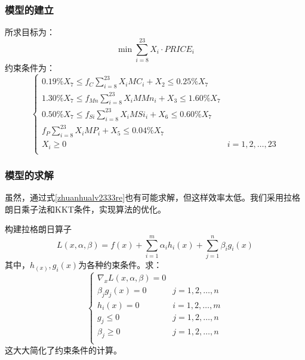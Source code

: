 \documentclass[12pt]{article}%
\begin{document}
\subsubsection{模型的建立}
所求目标为：
\begin{equation}\label{mubiao1}
\min \sum_{i=8}^{23}X_i\cdot PRICE_{i}
\end{equation}
约束条件为：
\begin{equation}\label{zhuanhualv2333re}
\left\{
             \begin{array}{cc}
0.19\% X_7 \leq f_C\sum_{i=8}^{23}X_iMC_i+X_2 \leq 0.25\% X_7\\
1.30\% X_7 \leq f_{Mn}\sum_{i=8}^{23}X_iMMn_i+X_3 \leq 1.60\% X_7\\
0.50\% X_7 \leq f_{Si}\sum_{i=8}^{23}X_iMSi_i+X_6 \leq 0.60\% X_7\\
  f_{P}\sum_{i=8}^{23}X_iMP_i+X_5 \leq 0.04\% X_7\\
  X_i\geq 0&i=1,2,\ldots,23\\
 \end{array}
\right.
\end{equation}
\subsubsection{模型的求解}
虽然，通过式\ref{zhuanhualv2333re}也有可能求解，但这样效率太低。我们采用拉格朗日乘子法和KKT条件，实现算法的优化。

构建拉格朗日算子
\begin{equation}\label{lagelangr}
  L(x,\alpha,\beta)=f(x)+\sum_{i=1}^{m}\alpha_i h_i(x)+\sum_{j=1}^{n}\beta_i g_i(x)
\end{equation}
其中，$h_(x),g_i(x)$为各种约束条件。求：
\begin{equation}\label{lagelangr2}
 \left\{
             \begin{array}{cc}
             \nabla_x L(x,\alpha,\beta)=0\\
             \beta_jg_j(x)=0&j=1,2,\ldots,n\\
             h_i(x)=0&i=1,2,\ldots,m\\
             g_j\leq 0&j=1,2,\ldots,n\\
             \beta_j\geq 0&j=1,2,\ldots,n\\
              \end{array}
\right.
\end{equation}
这大大简化了约束条件的计算。
\end{document}
